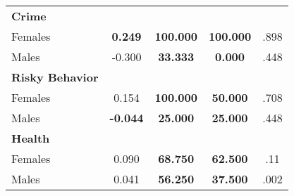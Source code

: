 \begin{tabular}{l c c c c}
\midrule
\textbf{Crime} & & & & \\
\quad Females &  \textbf{    0.249} & \textbf{  100.000} & \textbf{  100.000} & .898 \\
\quad Males &     -0.300 & \textbf{   33.333} & \textbf{    0.000} & .448 \\
\midrule
\textbf{Risky Behavior} & & & & \\
\quad Females &      0.154 & \textbf{  100.000} & \textbf{   50.000} & .708 \\
\quad Males &  \textbf{   -0.044} & \textbf{   25.000} & \textbf{   25.000} & .448 \\
\midrule
\textbf{Health} & & & & \\
\quad Females &      0.090 & \textbf{   68.750} & \textbf{   62.500} & .11 \\
\quad Males &      0.041 & \textbf{   56.250} & \textbf{   37.500} & .002 \\
\bottomrule
\end{tabular}
